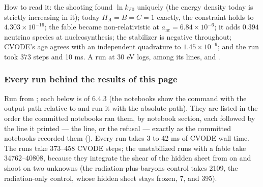 How to read it: the shooting found $\ln k_{F0}$ uniquely (the energy density today is strictly increasing in it); today $H_A = B = C = 1$ exactly, the constraint holds to $4.303\times10^{-16}$; the fable became non-relativistic at $a_{\mathrm{nr}} = 6.84\times10^{-6}$; it adds $0.394$ neutrino species at nucleosynthesis; the stabilizer is negative throughout; CVODE's age agrees with an independent quadrature to $1.45\times10^{-9}$; and the run took 373 steps and 10 ms. A  run at 30 eV logs, among its lines,  and .

\subsubsection{Every run behind the results of this page}
\label{sec:6.4.7}

Run from ; each  below is  of 6.4.3 (the notebooks show the command with the output path relative to  and run it with the absolute path). They are listed in the order the committed notebooks ran them, by notebook section, each followed by the line it printed --- the  line, or the refusal --- exactly as the committed notebooks recorded them (). Every run takes 3 to 42 ms of CVODE wall time. The  runs take 373--458 CVODE steps; the unstabilized  runs with a fable take 34762--40808, because they integrate the shear of the hidden sheet from  on and shoot on two unknowns (the radiation-plus-baryons control takes 2109, the radiation-only control, whose hidden sheet stays frozen, 7, and  395).

